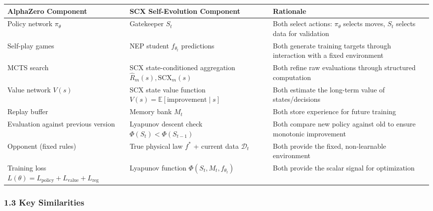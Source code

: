 \documentclass[
  12pt,
]{article}
\begin{document}
\begin{longtable}[]{@{}
  >{\raggedright\arraybackslash}p{}
  >{\raggedright\arraybackslash}p{}
  >{\raggedright\arraybackslash}p{}@{}}
\toprule\noalign{}
\begin{minipage}[b]{\linewidth}\raggedright
AlphaZero Component
\end{minipage} & \begin{minipage}[b]{\linewidth}\raggedright
SCX Self-Evolution Component
\end{minipage} & \begin{minipage}[b]{\linewidth}\raggedright
Rationale
\end{minipage} \\
\midrule\noalign{}
\endhead
\bottomrule\noalign{}
\endlastfoot
Policy network \(\pi_\theta\) & Gatekeeper \(S_t\) & Both select
actions: \(\pi_\theta\) selects moves, \(S_t\) selects data for
validation \\
Self-play games & NEP student \(f_{\theta_t}\) predictions & Both
generate training targets through interaction with a fixed
environment \\
MCTS search & SCX state-conditioned aggregation
\(\hat{R}_m(s), \text{SCX}_m(s)\) & Both refine raw evaluations through
structured computation \\
Value network \(V(s)\) & SCX state value function
\(V(s) = \mathbb{E}[\text{improvement} \mid s]\) & Both estimate the
long-term value of states/decisions \\
Replay buffer & Memory bank \(M_t\) & Both store experience for future
training \\
Evaluation against previous version & Lyapunov descent check
\(\Phi(S_t) < \Phi(S_{t-1})\) & Both compare new policy against old to
ensure monotonic improvement \\
Opponent (fixed rules) & True physical law \(f^*\) + current data
\(\mathcal{D}_t\) & Both provide the fixed, non-learnable environment \\
Training loss
\(L(\theta) = L_{\text{policy}} + L_{\text{value}} + L_{\text{reg}}\) &
Lyapunov function \(\Phi(S_t, M_t, f_{\theta_t})\) & Both provide the
scalar signal for optimization \\
\end{longtable}

\subsubsection{1.3 Key Similarities}\label{key-similarities}
\end{document}
